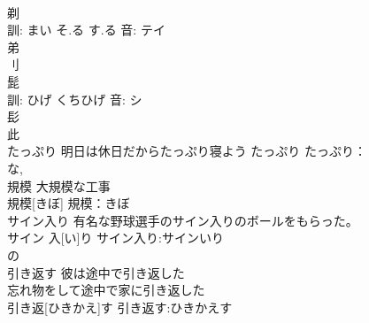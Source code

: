 \documentclass[8pt]{extreport}
\begin{document}
\begin{CJK}{UTF8}{min}
\\	剃 
\\	訓: まい そ.る す.る 音: テイ 
\\	弟 
\\	刂 
\\	髭 
\\	訓: ひげ くちひげ 音: シ 
\\	髟 
\\	此 
\\	たっぷり	明日は休日だからたっぷり寝よう	たっぷり			たっぷり：
\\	な, 
\\	規模	大規模な工事 
\\	規模[きぼ]			規模：きぼ
\\	サイン入り	有名な野球選手のサイン入りのボールをもらった。 
\\	サイン 入[い]り			サイン入り:サインいり
\\	の 
\\	引き返す	彼は途中で引き返した 
\\	忘れ物をして途中で家に引き返した 
\\	引き返[ひきかえ]す			引き返す:ひきかえす
\end{CJK}
\end{document}

